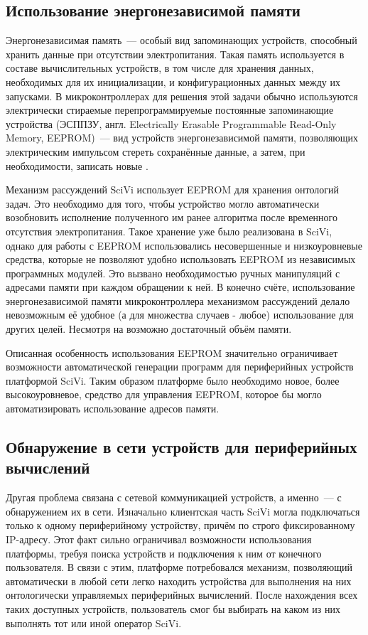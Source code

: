 \subsection{Использование энергонезависимой памяти}

Энергонезависимая память~--- особый вид запоминающих устройств, способный хранить данные при отсутствии электропитания.
Такая память используется в составе вычислительных устройств, в том числе для хранения данных, необходимых для их инициализации, и конфигурационных данных между их запусками.
В микроконтроллерах для решения этой задачи обычно используются электрически стираемые перепрограммируемые постоянные запоминающие устройства (ЭСППЗУ, англ. Electrically Erasable Programmable Read-Only Memory, EEPROM)~--- вид устройств энергонезависимой памяти, позволяющих электрическим импульсом стереть сохранённые данные, а затем, при необходимости, записать новые \cite{incollection:eeprom-proposal, article:eeprom}.

Механизм рассуждений SciVi использует EEPROM для хранения онтологий задач.
Это необходимо для того, чтобы устройство могло автоматически возобновить исполнение полученного им ранее алгоритма после временного отсутствия электропитания.
Такое хранение уже было реализована в SciVi, однако для работы с EEPROM использовались несовершенные и низкоуровневые средства, которые не позволяют удобно использовать EEPROM из независимых программных модулей.
Это вызвано необходимостью ручных манипуляций с адресами памяти при каждом обращении к ней.
В конечно счёте, использование энергонезависимой памяти микроконтроллера механизмом рассуждений делало невозможным её удобное (а для множества случаев - любое) использование для других целей.
Несмотря на возможно достаточный объём памяти.

Описанная особенность использования EEPROM значительно ограничивает возможности автоматической генерации программ для периферийных устройств платформой SciVi.
Таким образом платформе было необходимо новое, более высокоуровневое, средство для управления EEPROM, которое бы могло автоматизировать использование адресов памяти.

\subsection{Обнаружение в сети устройств для периферийных вычислений}

Другая проблема связана с сетевой коммуникацией устройств, а именно~--- с обнаружением их в сети.
Изначально клиентская часть SciVi могла подключаться только к одному периферийному устройству, причём по строго фиксированному IP-адресу.
Этот факт сильно ограничивал возможности использования платформы, требуя поиска устройств и подключения к ним от конечного пользователя. 
В связи с этим, платформе потребовался механизм, позволяющий автоматически в любой сети легко находить устройства для выполнения на них онтологически управляемых периферийных вычислений.
После нахождения всех таких доступных устройств, пользователь смог бы выбирать на каком из них выполнять тот или иной оператор SciVi. 

